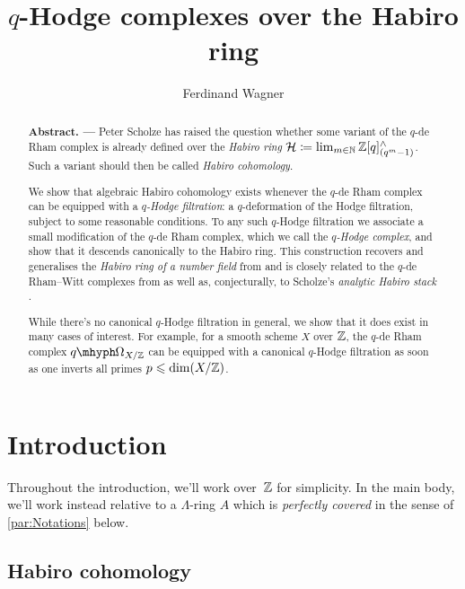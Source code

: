 \documentclass[DIV=12,numbers=enddot,leqno,bibliography=totoc]{scrartcl}
\title{\texorpdfstring{$q$}{q}-Hodge complexes over the Habiro ring}
\author{Ferdinand Wagner}
\begin{document}
	\maketitle
	
	\begin{abstract}
		\textbf{Abstract. --- }
		Peter Scholze has raised the question whether some variant of the $q$-de Rham complex is already defined over the \emph{Habiro ring} $\Hh\coloneqq \limit_{m\in\IN}\IZ[q]_{(q^m-1)}^\complete$. Such a variant should then be called \emph{ Habiro cohomology}.
		
		We show that algebraic Habiro cohomology exists whenever the $q$-de Rham complex can be equipped with a \emph{$q$-Hodge filtration}: a $q$-deformation of the Hodge filtration, subject to some reasonable conditions. To any such $q$-Hodge filtration we associate a small modification of the $q$-de Rham complex, which we call the \emph{$q$-Hodge complex}, and show that it descends canonically to the Habiro ring. This construction recovers and generalises the \emph{Habiro ring of a number field} from \cite{HabiroRingOfNumberField} and is closely related to the $q$-de Rham--Witt complexes from \cite{qWitt} as well as, conjecturally, to Scholze's \emph{analytic Habiro stack} \cite{HabiroCohomologyLecture}.
		
		While there's no canonical $q$-Hodge filtration in general, we show that it does exist in many cases of interest. For example, for a smooth scheme $X$ over $\mathbb{Z}$, the $q$-de Rham complex $\qOmega_{X/\IZ}$ can be equipped with a canonical $q$-Hodge filtration as soon as one inverts all primes $p\leqslant \dim(X/\mathbb{Z})$.
	\end{abstract}

	\tableofcontents
	\renewcommand{\SectionPrefix}{\textrm{\S}}
	\renewcommand{\SubsectionPrefix}{\textrm{\S}}
	
	\newpage
	
	
	\section{Introduction}\label{sec:Intro}
	
	Throughout the introduction, we'll work over~$\mathbb{Z}$ for simplicity. In the main body, we'll work instead relative to a $\Lambda$-ring $A$ which is \emph{perfectly covered} in the sense of \cref{par:Notations} below.
	
	\subsection{Habiro cohomology}
	
\end{document}
